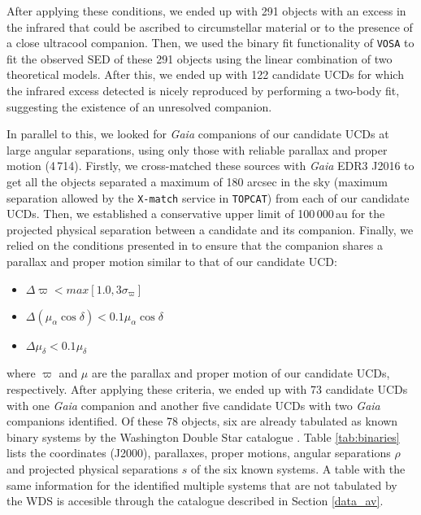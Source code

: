 After applying these conditions, we ended up with 291 objects with an excess in the infrared that could be ascribed to circumstellar material or to the presence of a close ultracool companion. Then, we used the binary fit functionality of \texttt{VOSA} to fit the observed SED of these 291 objects using the linear combination of two theoretical models. After this, we ended up with 122 candidate UCDs for which the infrared excess detected is nicely reproduced by performing a two-body fit, suggesting the existence of an unresolved companion.

In parallel to this, we looked for \textit{Gaia} companions of our candidate UCDs at large angular separations, using only those with reliable parallax and proper motion (4\,714). Firstly, we cross-matched these sources with \textit{Gaia} EDR3 J2016 to get all the objects separated a maximum of 180 arcsec in the sky (maximum separation allowed by the \texttt{X-match} service in \texttt{TOPCAT}) from each of our candidate UCDs. Then, we established a conservative upper limit of 100\,000\,au for the projected physical separation between a candidate and its companion. Finally, we relied on the conditions presented in \citet{smart_dwarfs} to ensure that the companion shares a parallax and proper motion similar to that of our candidate UCD:


\begin{itemize}

    \item $\Delta \varpi < max[1.0, 3\sigma_{\varpi}]$
    \item $\Delta(\mu_{\alpha}\cos{\delta}) < 0.1\mu_{\alpha}\cos{\delta}$
    \item $\Delta \mu_{\delta} < 0.1\mu_{\delta}$

\end{itemize}

\noindent where $\varpi$ and $\mu$ are the parallax and proper motion of our candidate UCDs, respectively. After applying these criteria, we ended up with 73 candidate UCDs with one \textit{Gaia} companion and another five candidate UCDs with two \textit{Gaia} companions identified. Of these 78 objects, six are already tabulated as known binary systems by the Washington Double Star catalogue \citep[WDS;][]{WDS}. Table \ref{tab:binaries} lists the coordinates (J2000), parallaxes, proper motions, angular separations $\rho$ and projected physical separations $s$ of the six known systems. A table with the same information for the identified multiple systems that are not tabulated by the WDS is accesible through the catalogue described in Section \ref{data_av}.

